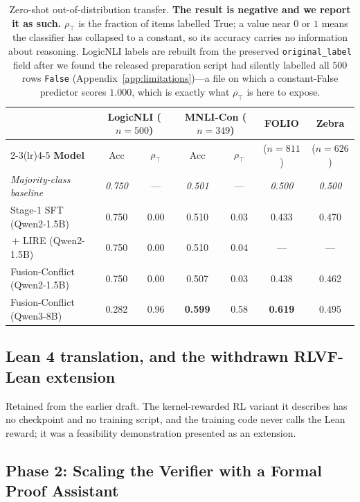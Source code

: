 \documentclass{article}
\begin{document}
\begin{table}[h]
\centering\small
\caption{Zero-shot out-of-distribution transfer. \textbf{The result is negative and we report it as such.} $\rho_{\top}$ is the fraction of items labelled True; a value near $0$ or $1$ means the classifier has collapsed to a constant, so its accuracy carries no information about reasoning. LogicNLI labels are rebuilt from the preserved \texttt{original\_label} field after we found the released preparation script had silently labelled all $500$ rows \texttt{False} (Appendix~\ref{app:limitations})---a file on which a constant-False predictor scores $1.000$, which is exactly what $\rho_{\top}$ is here to expose.}
\label{tab:external_transfer}\label{tab:real_world_results}
\setlength{\tabcolsep}{4pt}
\begin{tabular}{lcccccc}
\toprule
& \multicolumn{2}{c}{\textbf{LogicNLI} ($n{=}500$)} & \multicolumn{2}{c}{\textbf{MNLI-Con} ($n{=}349$)} & \textbf{FOLIO} & \textbf{Zebra} \\
\cmidrule(lr){2-3}\cmidrule(lr){4-5}
\textbf{Model} & Acc & $\rho_{\top}$ & Acc & $\rho_{\top}$ & ($n{=}811$) & ($n{=}626$) \\
\midrule
\emph{Majority-class baseline} & \emph{0.750} & --- & \emph{0.501} & --- & \emph{0.500} & \emph{0.500} \\
\midrule
Stage-1 SFT (Qwen2-1.5B)        & 0.750 & 0.00 & 0.510 & 0.03 & 0.433 & 0.470 \\
\,$+$ LIRE (Qwen2-1.5B)         & 0.750 & 0.00 & 0.510 & 0.04 & --- & --- \\
Fusion-Conflict (Qwen2-1.5B)    & 0.750 & 0.00 & 0.507 & 0.03 & 0.438 & 0.462 \\
\rowcolor{gray!10} Fusion-Conflict (Qwen3-8B) & 0.282 & 0.96 & \textbf{0.599} & 0.58 & \textbf{0.619} & 0.495 \\
\bottomrule
\end{tabular}
\end{table}

\subsection{Lean 4 translation, and the withdrawn RLVF-Lean extension}
\label{app:leandetail}
Retained from the earlier draft. The kernel-rewarded RL variant it describes has
no checkpoint and no training script, and the training code never calls the Lean
reward; it was a feasibility demonstration presented as an extension.

\subsection{Phase 2: Scaling the Verifier with a Formal Proof Assistant}
\label{app:phase2}
\end{document}
